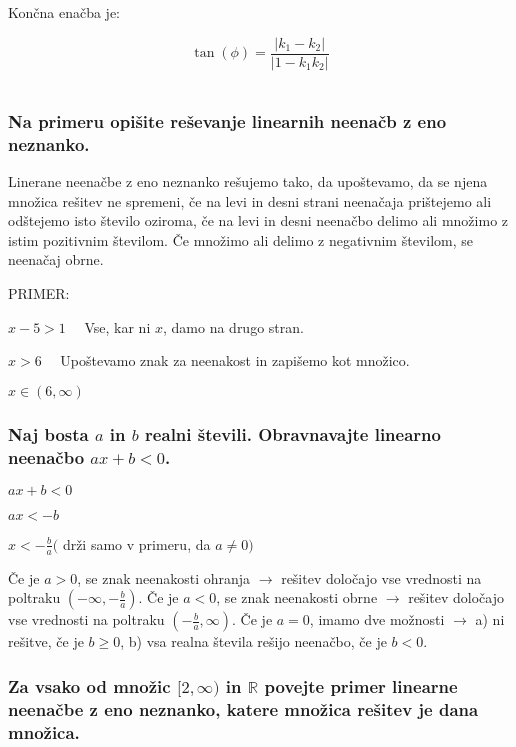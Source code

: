 \documentclass{article}
\begin{document}
Končna enačba je:

$$
    \tan(\phi) = {\frac{|k_1 - k_2|}{|1 - k_1 k_2|}}
$$

\section{\texorpdfstring{}{Linearne neenačbe}}
\subsubsection*{Na primeru opišite reševanje linearnih neenačb z eno neznanko.}

Linerane neenačbe z eno neznanko rešujemo tako, da upoštevamo, da se njena množica rešitev ne spremeni, če na levi in desni strani neenačaja prištejemo ali odštejemo isto število oziroma, če na levi in desni neenačbo delimo ali množimo z istim pozitivnim številom. Če množimo ali delimo z negativnim številom, se neenačaj obrne.

PRIMER:

$x-5>1 \quad$ Vse, kar ni $x$, damo na drugo stran.

$x>6 \quad$ Upoštevamo znak za neenakost in zapišemo kot množico.

$x \in(6, \infty)$

\subsubsection*{Naj bosta $a$ in $b$ realni števili. Obravnavajte linearno neenačbo $a x+b<0$.}

$a x+b<0$

$a x<-b$

$x<-\frac{b}{a}($ drži samo v primeru, da $a \neq 0)$

Če je $a>0$, se znak neenakosti ohranja $\rightarrow$ rešitev določajo vse vrednosti na poltraku $\left(-\infty,-\frac{b}{a}\right)$. Če je $a<0$, se znak neenakosti obrne $\rightarrow$ rešitev določajo vse vrednosti na poltraku $\left(-\frac{b}{a}, \infty\right)$. Če je $a=0$, imamo dve možnosti $\rightarrow$ a) ni rešitve, če je $b \geq 0$, b) vsa realna števila rešijo neenačbo, če je $b<0$.

\subsubsection*{Za vsako od množic $[2, \infty)$ in $\mathbb{R}$ povejte primer linearne neenačbe z eno neznanko, katere množica rešitev je dana množica.}
\end{document}
